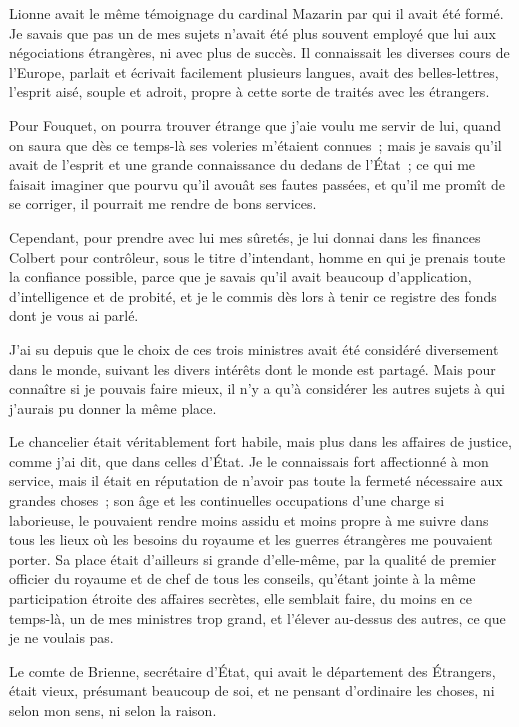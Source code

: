 \documentclass[french,twoside]{book} %
\begin{document}
Lionne avait le même témoignage du cardinal Mazarin par qui il avait été formé. Je savais que pas un de mes sujets n’avait été plus souvent employé que lui aux négociations étrangères, ni avec plus de succès. Il connaissait les diverses cours de l’Europe, parlait et écrivait facilement plusieurs langues, avait des belles-lettres, l’esprit aisé, souple et adroit, propre à cette sorte de traités avec les étrangers.\par
Pour Fouquet, on pourra trouver étrange que j’aie voulu me servir de lui, quand on saura que dès ce temps-là ses voleries m’étaient connues ; mais je savais qu’il avait de l’esprit et une grande connaissance du dedans de l’État ; ce qui me faisait imaginer que pourvu qu’il avouât ses fautes passées, et qu’il me promît de se corriger, il pourrait me rendre de bons services.\par
Cependant, pour prendre avec lui mes sûretés, je lui donnai dans les finances Colbert pour contrôleur, sous le titre d’intendant, homme en qui je prenais toute la confiance possible, parce que je savais qu’il avait beaucoup d’application, d’intelligence et de probité, et je le commis dès lors à tenir ce registre des fonds dont je vous ai parlé.\par
J’ai su depuis que le choix de ces trois ministres avait été considéré diversement dans le monde, suivant les divers intérêts dont le monde est partagé. Mais pour connaître si je pouvais faire mieux, il n’y a qu’à considérer les autres sujets à qui j’aurais pu donner la même place.\par
Le chancelier était véritablement fort habile, mais plus dans les affaires de justice, comme j’ai dit, que dans celles d’État. Je le connaissais fort affectionné à mon service, mais il était en réputation de n’avoir pas toute la fermeté nécessaire aux grandes choses ; son âge et les continuelles occupations d’une charge si laborieuse, le pouvaient rendre moins assidu et moins propre à me suivre dans tous les lieux où les besoins du royaume et les guerres étrangères me pouvaient porter. Sa place était d’ailleurs si grande d’elle-même, par la qualité de premier officier du royaume et de chef de tous les conseils, qu’étant jointe à la même participation étroite des affaires secrètes, elle semblait faire, du moins en ce temps-là, un de mes ministres trop grand, et l’élever au-dessus des autres, ce que je ne voulais pas.\par
Le comte de Brienne, secrétaire d’État, qui avait le département des Étrangers, était vieux, présumant beaucoup de soi, et ne pensant d’ordinaire les choses, ni selon mon sens, ni selon la raison.\par
\end{document}
